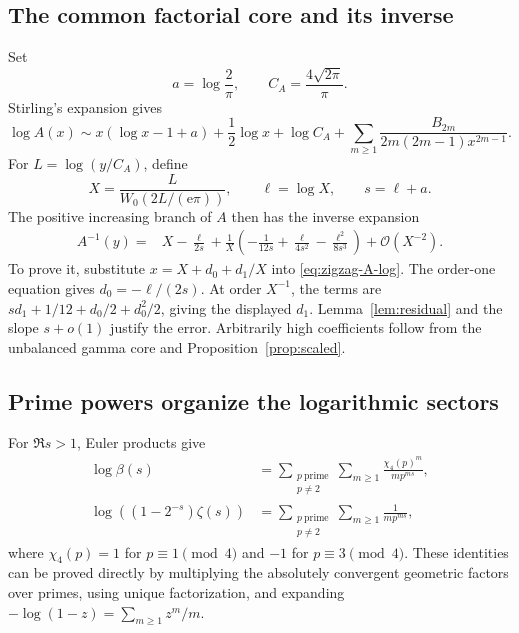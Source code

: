 \documentclass[11pt,a4paper]{article}
\numberwithin{equation}{section}
\theoremstyle{definition}
\theoremstyle{remark}
\newcommand{\ee}{\mathrm e}
\newcommand{\bigO}{\mathcal O}
\begin{document}
\subsection{The common factorial core and its inverse}

Set
\[
 a=\log\frac2\pi,\qquad C_A=\frac{4\sqrt{2\pi}}\pi.
\]
Stirling's expansion gives
\begin{equation}
 \log A(x)\sim x(\log x-1+a)+\frac12\log x+\log C_A
       +\sum_{m\ge1}\frac{B_{2m}}{2m(2m-1)x^{2m-1}}.
 \label{eq:zigzag-A-log}
\end{equation}
For $L=\log(y/C_A)$, define
\begin{equation}
 X=\frac{L}{W_0(2L/(\ee\pi))},\qquad
 \ell=\log X,\qquad s=\ell+a.
 \label{eq:zigzag-core}
\end{equation}
The positive increasing branch of $A$ then has the inverse expansion
\begin{align}
 A^{-1}(y)={}&X-\frac\ell{2s}
 +\frac1X\left(-\frac1{12s}+\frac\ell{4s^2}
                         -\frac{\ell^2}{8s^3}\right)
 +\bigO(X^{-2}).
 \label{eq:zigzag-A-inverse}
\end{align}
To prove it, substitute $x=X+d_0+d_1/X$ into \eqref{eq:zigzag-A-log}. The order-one equation gives $d_0=-\ell/(2s)$. At order $X^{-1}$, the terms are $sd_1+1/12+d_0/2+d_0^2/2$, giving the displayed $d_1$. Lemma~\ref{lem:residual} and the slope $s+o(1)$ justify the error. Arbitrarily high coefficients follow from the unbalanced gamma core and Proposition~\ref{prop:scaled}.

\subsection{Prime powers organize the logarithmic sectors}

For $\Re s>1$, Euler products give
\begin{align}
 \log\beta(s)&=\sum_{\substack{p\ \mathrm{prime}\\p\ne2}}
               \sum_{m\ge1}\frac{\chi_4(p)^m}{m p^{ms}},\nonumber\\
 \log((1-2^{-s})\zeta(s))&=
             \sum_{\substack{p\ \mathrm{prime}\\p\ne2}}
               \sum_{m\ge1}\frac1{m p^{ms}},
 \label{eq:zigzag-primes}
\end{align}
where $\chi_4(p)=1$ for $p\equiv1\pmod4$ and $-1$ for $p\equiv3\pmod4$. These identities can be proved directly by multiplying the absolutely convergent geometric factors over primes, using unique factorization, and expanding $-\log(1-z)=\sum_{m\ge1}z^m/m$.
\end{document}
